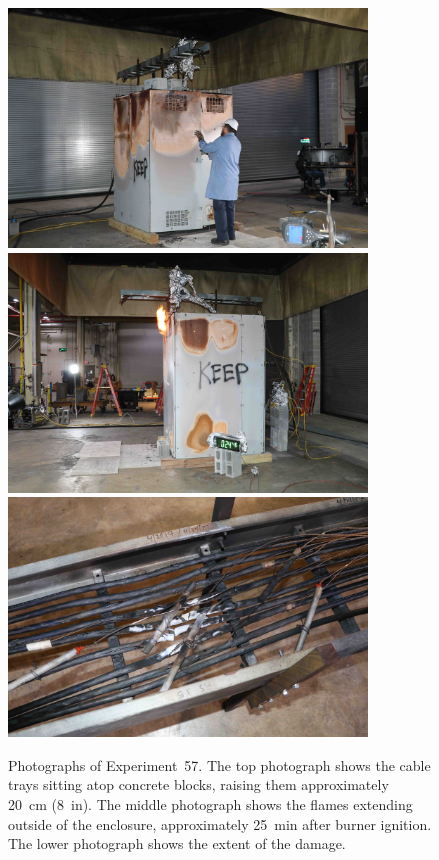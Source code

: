 \begin{figure}[p]
\centering
\includegraphics[height=2.50in]{../FIGURES/Test_57_setup} \\
\includegraphics[height=2.50in]{../FIGURES/Test_57_24_min_46_s} \\
\includegraphics[height=2.50in]{../FIGURES/Test_57_scar}
\caption[Photographs of Experiment~57]{Photographs of Experiment~57. The top photograph shows the cable trays sitting atop concrete blocks, raising them approximately 20~cm (8~in). The middle photograph shows the flames extending outside of the enclosure, approximately 25~min after burner ignition. The lower photograph shows the extent of the damage.}
\label{fig:Test_57_photos}
\end{figure}


